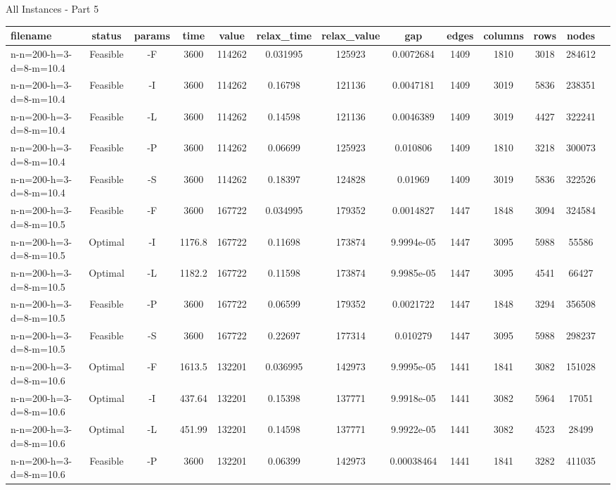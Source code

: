 \documentclass[landscape, a4paper]{article}
\begin{document}
\begin{center}
All Instances - Part 5

\begin{tabular}{lcccccccccccc}
filename & status & params & time & value & relax\_time & relax\_value & gap & edges & columns & rows & nodes & \\
\hline
n-n=200-h=3-d=8-m=10.4 & Feasible & -F & 3600 & 114262 & 0.031995 & 125923 & 0.0072684 & 1409 & 1810 & 3018 & 284612 & \\
n-n=200-h=3-d=8-m=10.4 & Feasible & -I & 3600 & 114262 & 0.16798 & 121136 & 0.0047181 & 1409 & 3019 & 5836 & 238351 & \\
n-n=200-h=3-d=8-m=10.4 & Feasible & -L & 3600 & 114262 & 0.14598 & 121136 & 0.0046389 & 1409 & 3019 & 4427 & 322241 & \\
n-n=200-h=3-d=8-m=10.4 & Feasible & -P & 3600 & 114262 & 0.06699 & 125923 & 0.010806 & 1409 & 1810 & 3218 & 300073 & \\
n-n=200-h=3-d=8-m=10.4 & Feasible & -S & 3600 & 114262 & 0.18397 & 124828 & 0.01969 & 1409 & 3019 & 5836 & 322526 & \\
n-n=200-h=3-d=8-m=10.5 & Feasible & -F & 3600 & 167722 & 0.034995 & 179352 & 0.0014827 & 1447 & 1848 & 3094 & 324584 & \\
n-n=200-h=3-d=8-m=10.5 & Optimal & -I & 1176.8 & 167722 & 0.11698 & 173874 & 9.9994e-05 & 1447 & 3095 & 5988 & 55586 & \\
n-n=200-h=3-d=8-m=10.5 & Optimal & -L & 1182.2 & 167722 & 0.11598 & 173874 & 9.9985e-05 & 1447 & 3095 & 4541 & 66427 & \\
n-n=200-h=3-d=8-m=10.5 & Feasible & -P & 3600 & 167722 & 0.06599 & 179352 & 0.0021722 & 1447 & 1848 & 3294 & 356508 & \\
n-n=200-h=3-d=8-m=10.5 & Feasible & -S & 3600 & 167722 & 0.22697 & 177314 & 0.010279 & 1447 & 3095 & 5988 & 298237 & \\
n-n=200-h=3-d=8-m=10.6 & Optimal & -F & 1613.5 & 132201 & 0.036995 & 142973 & 9.9995e-05 & 1441 & 1841 & 3082 & 151028 & \\
n-n=200-h=3-d=8-m=10.6 & Optimal & -I & 437.64 & 132201 & 0.15398 & 137771 & 9.9918e-05 & 1441 & 3082 & 5964 & 17051 & \\
n-n=200-h=3-d=8-m=10.6 & Optimal & -L & 451.99 & 132201 & 0.14598 & 137771 & 9.9922e-05 & 1441 & 3082 & 4523 & 28499 & \\
n-n=200-h=3-d=8-m=10.6 & Feasible & -P & 3600 & 132201 & 0.06399 & 142973 & 0.00038464 & 1441 & 1841 & 3282 & 411035 & \\

\end{tabular}
\end{center}
\end{document}
